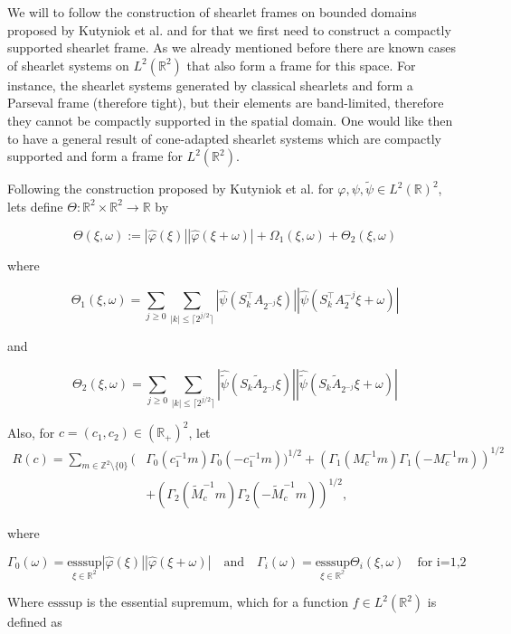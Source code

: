 \documentclass[a4paper]{article}
\begin{document}
We will to follow the construction of shearlet frames on bounded domains proposed by Kutyniok et al. \cite{ShearBounded} and for that we first need to construct a compactly supported shearlet frame. As we already mentioned before there are known cases of shearlet systems on $L^2(\mathbb{R}^2)$ that also form a frame for this space. For instance, the shearlet systems generated by classical shearlets and form a Parseval frame (therefore tight), but their elements are band-limited, therefore they cannot be compactly supported in the spatial domain. One would like then to have a general result of cone-adapted shearlet systems which are compactly supported and form a frame for $L^2(\mathbb{R}^2)$.

\bigskip

Following the construction proposed by Kutyniok et al. \cite{ConstructCompactShear} for $\varphi,\psi,\tilde{\psi}\in L^2(\mathbb{R})^2$, lets define $\Theta :\mathbb{R}^2\times\mathbb{R}^2\longrightarrow \mathbb{R}$ by

$$
\Theta(\xi,\omega):= |\hat{\varphi}(\xi)||\hat{\varphi}(\xi+\omega)|+\Omega_1(\xi,\omega)+\Theta_2(\xi,\omega)
$$

where

$$
\Theta_1(\xi,\omega)=\sum_{j\geq 0}\sum_{|k|\leq \lceil 2^{j/2}\rceil}|\hat{\psi}(S_k^{\intercal}A_{2^{-j}}\xi)||\hat{\psi}(S_k^{\intercal}A_2^{-j}\xi+\omega)|
$$

and

$$
\Theta_2(\xi,\omega)=\sum_{j\geq 0}\sum_{|k|\leq \lceil 2^{j/2}\rceil}|\hat{\tilde{\psi}}(S_k\tilde{A}_{2^{-j}}\xi)||\hat{\tilde{\psi}}(S_k\tilde{A}_{2^{-j}}\xi+\omega)|
$$

Also, for $c=(c_1,c_2)\in(\mathbb{R}_+)^2$, let
$$
\begin{aligned}
R(c)=\sum_{m\in\mathbb{Z}^2\setminus\{0\}}(&\Gamma_0(c_1^{-1}m)\Gamma_0(-c_1^{-1}m))^{1/2}+(\Gamma_1(M_c^{-1}m)\Gamma_1(-M_c^{-1}m))^{1/2}\\
&+(\Gamma_2(\tilde{M}_c^{-1}m)\Gamma_2(-\tilde{M}_c^{-1}m))^{1/2},
\end{aligned}
$$

where

$$
\Gamma_0(\omega)=\underset{\xi\in\mathbb{R}^2}{\text{ess}\text{sup}}|\hat{\varphi}(\xi)||\hat{\varphi}(\xi+\omega)| \quad \text{and} \quad \Gamma_i(\omega)=\underset{\xi\in\mathbb{R^2}}{\text{ess}\text{sup}}\Theta_i(\xi,\omega)\quad\text{for i=1,2}
$$

Where $\text{ess}\text{sup}$ is the essential supremum, which for a function $f\in L^2(\mathbb{R}^2)$ is defined as
\end{document}
